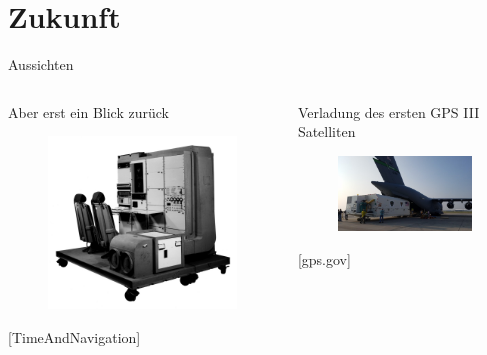 \section{Zukunft}

\begin{frame}{Aussichten}
    \begin{columns}
        \begin{column}{0.5\textwidth}
            Aber erst ein Blick zurück
            \begin{figure}
                \centering
                \includegraphics[width=\textwidth]{images/erster_empfaenger.jpg}
            \end{figure}
            {\small [TimeAndNavigation]}
        \end{column}\pause
        \begin{column}{0.5\textwidth}
            Verladung des ersten GPS III Satelliten
            \begin{figure}
                \centering
                \includegraphics[width=\textwidth]{images/gps3-satellit-verladung.JPG}
            \end{figure}
            {\small [gps.gov]}
        \end{column}
    \end{columns}
\end{frame}

